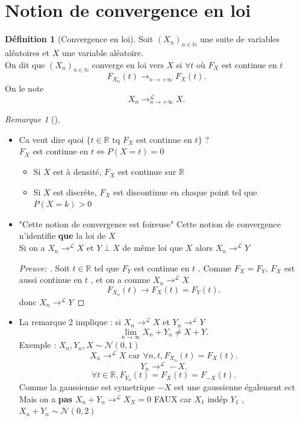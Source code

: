 \documentclass{article}
\theoremstyle{plain}%
\theoremstyle{definition}
\newtheorem{defn}{Définition}[section]
\theoremstyle{remark}
\newtheorem*{rem}{Remarque}
\begin{document}
\section{Notion de convergence en loi}
\begin{defn}[Convergence en loi]
    Soit $ (X_n)_{n \in \mathbb{N}} $ une suite de variables aléatoires et $ X $ une variable aléatoire. \\
    On dit que $ (X_n)_{n \in \mathbb{N}}  $ converge en loi vers $ X $ si $ \forall t  $ où $ F_X $ est continue en $ t $ 
    \[
        F_{X_n}(t) \to_{n \to +\infty } F_X(t)
    .\]
    On le note 
    \[
        X_n \to _{n \to +\infty}^{\mathcal{L}} X
    .\]
\end{defn}
\begin{rem}[]
    \begin{itemize}
        \item Ca veut dire quoi $ \{t \in \mathbb{R} \text{ tq } F_X \text{ est continue en } t\} $ ? \\
        $ F_X $ est continue en $ t \Leftrightarrow P(X=t)=0$ 
        \begin{itemize}
            \item Si $ X $ est à densité, $ F_X $ est continue sur $ \mathbb{R} $ 
            \item Si $ X $ est discrète, $ F_X $ est discontinue en chaque point tel que $ P(X=k) > 0 $ 
        \end{itemize}
        \item "Cette notion de convergence est foireuse" Cette notion de convergence n'identifie \textbf{que} la loi de $ X $ \\
        Si on a $ X_n \to^\mathcal{L} X $ et $ Y\perp X  $ de même loi que $ X $ alors $ X_n \to^\mathcal{L} Y$ \begin{proof}[Preuve: ]
            Soit $ t \in \mathbb{R} $ tel que $ F_Y $ est continue en $ t $ . Comme $ F_X = F_Y $, $ F_X $ est aussi continue en $ t $ , et on a comme $ X_n \to ^\mathcal{L} X $ 
            \[
                F_{X_n}(t) \to F_X(t)=F_Y(t)
            .\]
            donc $ X_n \to ^\mathcal{L} Y $ 
        \end{proof}
    \item La remarque 2 implique  : si $ X_n \to^\mathcal{L} X $ et $ Y_n \to^\mathcal{L} Y $  
    \[
        \lim_{n \to \infty} X_n + Y_n \neq X+Y
    .\]
    Exemple : $ X_n, Y_n, X \sim \mathcal{N}(0,1) $ 
    \[
        X_n \to^\mathcal{L}X \text{ car } \forall n, t, F_{X_n} (t) = F_X(t)
    .\]
    \[
        Y_n \to ^\mathcal{L} -X
    .\]
    \[
        \forall t \in \mathbb{R}, F_{Y_n}(t)=F_{X}(t) = F_{-X}(t)
    .\]
    Comme la gaussienne est symetrique $ -X $ est une gaussienne également ect \\
    Mais on a \textbf{pas} $ X_n + Y_n \to^\mathcal{L}X_X=0  $ FAUX car $ X_1 $ indép $ Y_1 $ , $ X_n + Y_n \sim \mathcal{N}(0,2) $ 
    \end{itemize}
\end{rem}
\end{document}
